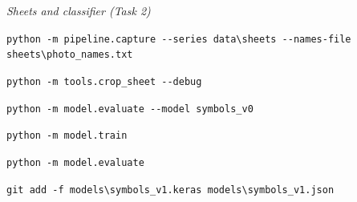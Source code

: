 \medskip\noindent\textit{Sheets and classifier (Task 2)}\par\nopagebreak\smallskip
\noindent\lstinline[style=sumlist]|python -m pipeline.capture --series data\sheets --names-file sheets\photo_names.txt|\\
\hspace*{1.2em}{\small Photograph the 54 sheet photographs}\par\smallskip
\noindent\lstinline[style=sumlist]|python -m tools.crop_sheet --debug|\\
\hspace*{1.2em}{\small Cut the sheet photographs into labelled crops}\par\smallskip
\noindent\lstinline[style=sumlist]|python -m model.evaluate --model symbols_v0|\\
\hspace*{1.2em}{\small Accuracy of the old classifier on held-out real crops}\par\smallskip
\noindent\lstinline[style=sumlist]|python -m model.train|\\
\hspace*{1.2em}{\small Retrain the network on synthetic and real crops}\par\smallskip
\noindent\lstinline[style=sumlist]|python -m model.evaluate|\\
\hspace*{1.2em}{\small Accuracy of the new classifier on held-out real crops}\par\smallskip
\noindent\lstinline[style=sumlist]|git add -f models\symbols_v1.keras models\symbols_v1.json|\\
\hspace*{1.2em}{\small Include the classifier in the next commit}\par\smallskip

